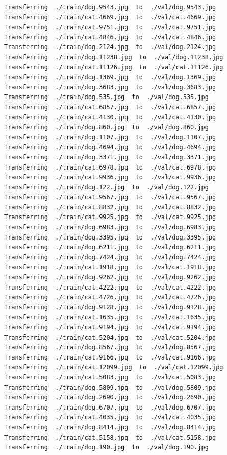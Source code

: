 \documentclass[]{book}
\theoremstyle{definition}
\theoremstyle{definition}
\theoremstyle{definition}
\theoremstyle{remark}
\begin{document}
\begin{verbatim}
Transferring  ./train/dog.9543.jpg  to  ./val/dog.9543.jpg
Transferring  ./train/cat.4669.jpg  to  ./val/cat.4669.jpg
Transferring  ./train/cat.9751.jpg  to  ./val/cat.9751.jpg
Transferring  ./train/cat.4846.jpg  to  ./val/cat.4846.jpg
Transferring  ./train/dog.2124.jpg  to  ./val/dog.2124.jpg
Transferring  ./train/dog.11238.jpg  to  ./val/dog.11238.jpg
Transferring  ./train/cat.11126.jpg  to  ./val/cat.11126.jpg
Transferring  ./train/dog.1369.jpg  to  ./val/dog.1369.jpg
Transferring  ./train/dog.3683.jpg  to  ./val/dog.3683.jpg
Transferring  ./train/dog.535.jpg  to  ./val/dog.535.jpg
Transferring  ./train/cat.6857.jpg  to  ./val/cat.6857.jpg
Transferring  ./train/cat.4130.jpg  to  ./val/cat.4130.jpg
Transferring  ./train/dog.860.jpg  to  ./val/dog.860.jpg
Transferring  ./train/dog.1107.jpg  to  ./val/dog.1107.jpg
Transferring  ./train/dog.4694.jpg  to  ./val/dog.4694.jpg
Transferring  ./train/dog.3371.jpg  to  ./val/dog.3371.jpg
Transferring  ./train/cat.6978.jpg  to  ./val/cat.6978.jpg
Transferring  ./train/cat.9936.jpg  to  ./val/cat.9936.jpg
Transferring  ./train/dog.122.jpg  to  ./val/dog.122.jpg
Transferring  ./train/cat.9567.jpg  to  ./val/cat.9567.jpg
Transferring  ./train/cat.8832.jpg  to  ./val/cat.8832.jpg
Transferring  ./train/cat.9925.jpg  to  ./val/cat.9925.jpg
Transferring  ./train/dog.6983.jpg  to  ./val/dog.6983.jpg
Transferring  ./train/dog.3395.jpg  to  ./val/dog.3395.jpg
Transferring  ./train/dog.6211.jpg  to  ./val/dog.6211.jpg
Transferring  ./train/dog.7424.jpg  to  ./val/dog.7424.jpg
Transferring  ./train/cat.1918.jpg  to  ./val/cat.1918.jpg
Transferring  ./train/dog.9262.jpg  to  ./val/dog.9262.jpg
Transferring  ./train/cat.4222.jpg  to  ./val/cat.4222.jpg
Transferring  ./train/cat.4726.jpg  to  ./val/cat.4726.jpg
Transferring  ./train/dog.9128.jpg  to  ./val/dog.9128.jpg
Transferring  ./train/cat.1635.jpg  to  ./val/cat.1635.jpg
Transferring  ./train/cat.9194.jpg  to  ./val/cat.9194.jpg
Transferring  ./train/cat.5204.jpg  to  ./val/cat.5204.jpg
Transferring  ./train/dog.8567.jpg  to  ./val/dog.8567.jpg
Transferring  ./train/cat.9166.jpg  to  ./val/cat.9166.jpg
Transferring  ./train/cat.12099.jpg  to  ./val/cat.12099.jpg
Transferring  ./train/cat.5083.jpg  to  ./val/cat.5083.jpg
Transferring  ./train/dog.5809.jpg  to  ./val/dog.5809.jpg
Transferring  ./train/dog.2690.jpg  to  ./val/dog.2690.jpg
Transferring  ./train/dog.6707.jpg  to  ./val/dog.6707.jpg
Transferring  ./train/cat.4035.jpg  to  ./val/cat.4035.jpg
Transferring  ./train/dog.8414.jpg  to  ./val/dog.8414.jpg
Transferring  ./train/cat.5158.jpg  to  ./val/cat.5158.jpg
Transferring  ./train/dog.190.jpg  to  ./val/dog.190.jpg

\end{verbatim}
\end{document}
